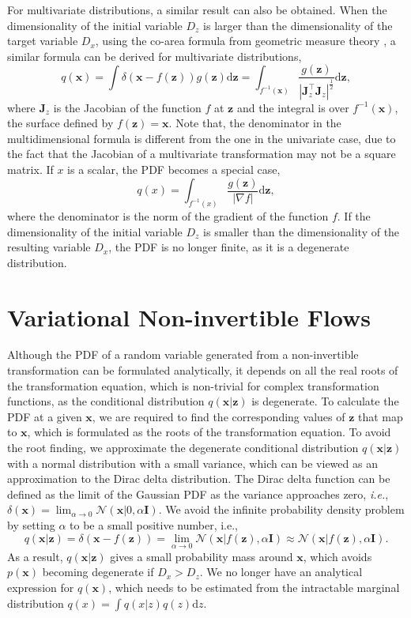 \documentclass{article}
\newcommand{\xV}{\mathbf{x}}
\newcommand{\zV}{\mathbf{z}}
\newcommand{\I}{\mathbf{I}}
\newcommand{\diff}{\text{d}}
\newcommand{\J}{\mathbf{J}}
\newcommand{\gaussianDist}[3]{\mathcal{N}\left(#1|#2,#3\right)}
\newcommand{\ie}{\textit{i.e.}}
\begin{document}
For multivariate distributions, a similar result can also be obtained. When the dimensionality of the initial variable $D_z$ is larger than the dimensionality of the target variable $D_x$, using the co-area formula from geometric measure theory \citep{Federer1969}, a similar formula can be derived for multivariate distributions,
\begin{equation}
q(\xV)  = \int \delta\left(\xV - f(\zV)\right) g(\zV) \diff \zV=  \int_{f^{-1}(\xV)}  \frac{g(\zV)}{\left|\J_z^\top\J_z\right|^{\frac{1}{2}}}  \diff \zV,
\end{equation}
where $\J_z$ is the Jacobian of the function $f$ at $\zV$ and the integral is over $f^{-1}(\xV)$, the surface defined by $f(\zV) = \xV$. Note that, the denominator in the multidimensional formula is different from the one in the univariate case, due to the fact that the Jacobian of a multivariate transformation may not be a square matrix. If $x$ is a scalar, the PDF becomes a special case,
\begin{equation}
q(x)  =  \int_{f^{-1}(x)}  \frac{g(\zV)}{\left|\nabla f\right|}  \diff \zV,
\end{equation}
where the denominator is the norm of the gradient of the function $f$. If the dimensionality of the initial variable $D_z$ is smaller than the dimensionality of the resulting variable $D_x$, the PDF is no longer finite, as it is a degenerate distribution.



\section{Variational Non-invertible Flows}

Although the PDF of a random variable generated from a non-invertible transformation can be formulated analytically, it depends on all the real roots of the transformation equation, which is non-trivial for complex transformation functions, as the conditional distribution $q(\xV|\zV)$ is degenerate. To calculate the PDF at a given $\xV$, we are required to find the corresponding values of $\zV$ that map to $\xV$, which is formulated as the roots of the transformation equation. To avoid the root finding, we approximate the degenerate conditional distribution $q(\xV|\zV)$ with a normal distribution with a small variance, which can be viewed as an approximation to the Dirac delta distribution. The Dirac delta function can be defined as the limit of the Gaussian PDF as the variance approaches zero, \ie, $\delta(\xV) = \lim_{\alpha \rightarrow 0} \gaussianDist{\xV}{0}{\alpha\I}$. We avoid the infinite probability density problem by setting $\alpha$ to be a small positive number, i.e.,
\begin{equation}
q(\xV|\zV) = \delta(\xV - f(\zV)) = \lim_{\alpha \rightarrow 0} \gaussianDist{\xV}{f(\zV)}{\alpha\I} \approx \gaussianDist{\xV}{f(\zV)}{\alpha\I}.
\end{equation}
As a result, $q(\xV|\zV)$ gives a small probability mass around $\xV$, which avoids $p(\xV)$ becoming degenerate if $D_x > D_z$. We no longer have an analytical expression for $q(\xV)$, which needs to be estimated from the intractable marginal distribution $q(x) = \int q(x|z) q(z) \diff z$.
\end{document}
